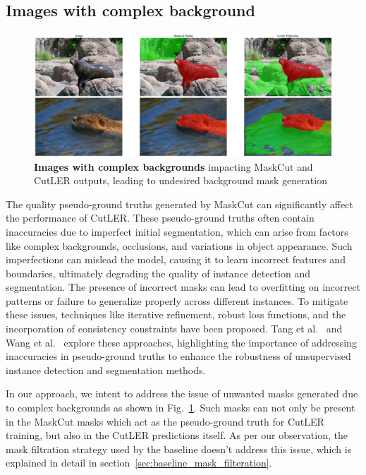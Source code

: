 \subsection{Images with complex background}
\begin{figure}
	\centering
	\includegraphics[width=1\textwidth]{Images/main/cutler-prob-noisy-bg.png}
	\caption[\textbf{Cutler performance on images with complex background}]{\textbf{Images with complex backgrounds} impacting MaskCut and CutLER outputs, leading to undesired background mask generation}
	\label{fig:cutler_noisy_bg_eg}
\end{figure}

The quality pseudo-ground truths generated by MaskCut can significantly affect the performance of CutLER. These pseudo-ground truths often contain inaccuracies due to imperfect initial segmentation, which can arise from factors like complex backgrounds, occlusions, and variations in object appearance. Such imperfections can mislead the model, causing it to learn incorrect features and boundaries, ultimately degrading the quality of instance detection and segmentation. The presence of incorrect masks can lead to overfitting on incorrect patterns or failure to generalize properly across different instances. To mitigate these issues, techniques like iterative refinement, robust loss functions, and the incorporation of consistency constraints have been proposed. Tang et al.~\cite{Tang_2018_CVPR} and Wang et al.~\cite{ziegler2022selfsupervisedlearningobjectparts} explore these approaches, highlighting the importance of addressing inaccuracies in pseudo-ground truths to enhance the robustness of unsupervised instance detection and segmentation methods.

In our approach, we intent to address the issue of unwanted masks generated due to complex backgrounds as shown in Fig.~\ref{fig:cutler_noisy_bg_eg}. Such masks can not only be present in the MaskCut masks which act as the pseudo-ground truth for CutLER training, but also in the CutLER predictions itself. As per our observation, the mask filtration strategy used by the baseline doesn't address this issue, which is explained in detail in section~\ref{sec:baseline_mask_filteration}.

